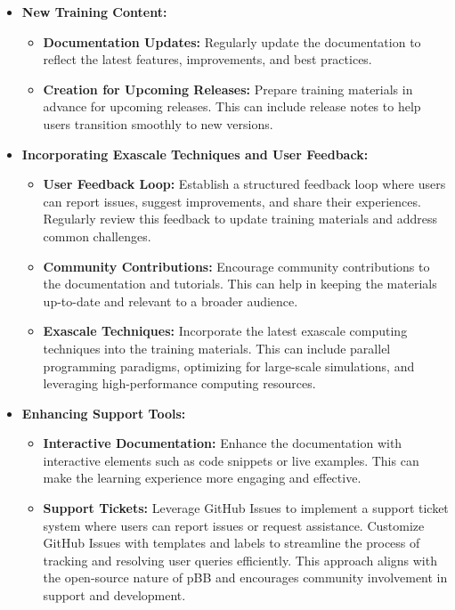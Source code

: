 \begin{itemize}
    \item \textbf{New Training Content:}
    \begin{itemize}
        \item \textbf{Documentation Updates:} Regularly update the documentation to reflect the latest features, improvements, and best practices.
        \item \textbf{Creation for Upcoming Releases:} Prepare training materials in advance for upcoming releases. This can include release notes to help users transition smoothly to new versions.
    \end{itemize}

    \item \textbf{Incorporating Exascale Techniques and User Feedback:}
    \begin{itemize}
        \item \textbf{User Feedback Loop:} Establish a structured feedback loop where users can report issues, suggest improvements, and share their experiences. Regularly review this feedback to update training materials and address common challenges.
        \item \textbf{Community Contributions:} Encourage community contributions to the documentation and tutorials. This can help in keeping the materials up-to-date and relevant to a broader audience.
        \item \textbf{Exascale Techniques:} Incorporate the latest exascale computing techniques into the training materials. This can include parallel programming paradigms, optimizing for large-scale simulations, and leveraging high-performance computing resources.
    \end{itemize}

    \item \textbf{Enhancing Support Tools:}
    \begin{itemize}
        \item \textbf{Interactive Documentation:} Enhance the documentation with interactive elements such as code snippets or live examples. This can make the learning experience more engaging and effective.
        \item \textbf{Support Tickets:} Leverage GitHub Issues to implement a support ticket system where users can report issues or request assistance. Customize GitHub Issues with templates and labels to streamline the process of tracking and resolving user queries efficiently. This approach aligns with the open-source nature of pBB and encourages community involvement in support and development.
    \end{itemize}
\end{itemize}
